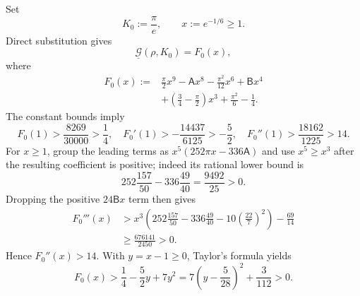 \documentclass[11pt]{article}
\theoremstyle{remark}
\begin{document}
Set
\begin{equation}
 K_0:=\frac\pi e,
 \qquad x:=e^{-1/6}\geq1.
 \label{rs:eq:base-x}
\end{equation}
Direct substitution gives
\begin{equation}
 \underline{\mathcal G}(\rho,K_0)=F_0(x),
 \label{rs:eq:G-base}
\end{equation}
where
\begin{equation}
 \begin{aligned}
 F_0(x):={}&\frac\pi2x^9-\mathsf A x^8
 -\frac{\pi^2}{12}x^6+\mathsf Bx^4\\
 &+\left(\frac34-\frac\pi2\right)x^3
 +\frac{\pi^2}{6}-\frac14.
 \end{aligned}
 \label{rs:eq:F0}
\end{equation}
The constant bounds imply
\begin{equation}
 F_0(1)>\frac{8269}{30000}>\frac14,
 \quad
 F_0'(1)>-\frac{14437}{6125}>-\frac52,
 \quad
 F_0''(1)>\frac{18162}{1225}>14.
 \label{rs:eq:F0-endpoint}
\end{equation}
For $x\geq1$, group the leading terms as
$x^5(252\pi x-336\mathsf A)$ and use $x^5\geq x^3$ after the
resulting coefficient is positive; indeed its rational lower bound is
\[
 252\frac{157}{50}-336\frac{49}{40}=\frac{9492}{25}>0.
\]
Dropping the positive
$24\mathsf Bx$ term then gives
\begin{equation}
 \begin{aligned}
 F_0'''(x)
 &>x^3\left(
 252\frac{157}{50}-336\frac{49}{40}
 -10\left(\frac{22}{7}\right)^2\right)-\frac{69}{14}\\
 &\geq\frac{676141}{2450}>0.
 \end{aligned}
 \label{rs:eq:F0-third}
\end{equation}
Hence $F_0''(x)>14$.  With $y=x-1\geq0$, Taylor's formula yields
\begin{equation}
 F_0(x)>\frac14-\frac52y+7y^2
 =7\left(y-\frac5{28}\right)^2+\frac3{112}>0.
 \label{rs:eq:F0-positive}
\end{equation}
\end{document}
